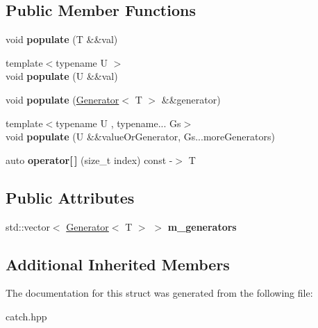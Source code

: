 \subsection*{Public Member Functions}
\begin{DoxyCompactItemize}
\item 
void {\bfseries populate} (T \&\&val)\hypertarget{structCatch_1_1Generators_1_1Generators_ad708036fa5a9bf0cd1520ce111bc851d}{}\label{structCatch_1_1Generators_1_1Generators_ad708036fa5a9bf0cd1520ce111bc851d}

\item 
{\footnotesize template$<$typename U $>$ }\\void {\bfseries populate} (U \&\&val)\hypertarget{structCatch_1_1Generators_1_1Generators_a8ff8b7dda734d1808b644fefc67f4c98}{}\label{structCatch_1_1Generators_1_1Generators_a8ff8b7dda734d1808b644fefc67f4c98}

\item 
void {\bfseries populate} (\hyperlink{classCatch_1_1Generators_1_1Generator}{Generator}$<$ T $>$ \&\&generator)\hypertarget{structCatch_1_1Generators_1_1Generators_a2155cad48ab03c362483e200d957eefc}{}\label{structCatch_1_1Generators_1_1Generators_a2155cad48ab03c362483e200d957eefc}

\item 
{\footnotesize template$<$typename U , typename... Gs$>$ }\\void {\bfseries populate} (U \&\&value\+Or\+Generator, Gs...\+more\+Generators)\hypertarget{structCatch_1_1Generators_1_1Generators_a941e9fe5de61a0475516489a1a63528b}{}\label{structCatch_1_1Generators_1_1Generators_a941e9fe5de61a0475516489a1a63528b}

\item 
auto {\bfseries operator\mbox{[}$\,$\mbox{]}} (size\+\_\+t index) const -\/$>$ T\hypertarget{structCatch_1_1Generators_1_1Generators_a1812ebb7d0146d63e3a005e93831afa2}{}\label{structCatch_1_1Generators_1_1Generators_a1812ebb7d0146d63e3a005e93831afa2}

\end{DoxyCompactItemize}
\subsection*{Public Attributes}
\begin{DoxyCompactItemize}
\item 
std\+::vector$<$ \hyperlink{classCatch_1_1Generators_1_1Generator}{Generator}$<$ T $>$ $>$ {\bfseries m\+\_\+generators}\hypertarget{structCatch_1_1Generators_1_1Generators_a49f1d0e8851a4726bb9981edffe094fa}{}\label{structCatch_1_1Generators_1_1Generators_a49f1d0e8851a4726bb9981edffe094fa}

\end{DoxyCompactItemize}
\subsection*{Additional Inherited Members}


The documentation for this struct was generated from the following file\+:\begin{DoxyCompactItemize}
\item 
catch.\+hpp\end{DoxyCompactItemize}
